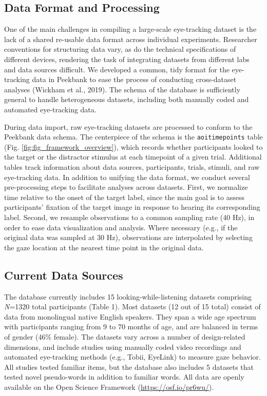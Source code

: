 \documentclass[10pt, letterpaper]{article}
\begin{document}
\hypertarget{data-format-and-processing}{%
\subsection{Data Format and
Processing}\label{data-format-and-processing}}

One of the main challenges in compiling a large-scale eye-tracking
dataset is the lack of a shared re-usable data format across individual
experiments. Researcher conventions for structuring data vary, as do the
technical specifications of different devices, rendering the task of
integrating datasets from different labs and data sources difficult. We
developed a common, tidy format for the eye-tracking data in Peekbank to
ease the process of conducting cross-dataset analyses (Wickham et al.,
2019). The schema of the database is sufficiently general to handle
heterogeneous datasets, including both manually coded and automated
eye-tracking data.

During data import, raw eye-tracking datasets are processed to conform
to the Peekbank data schema. The centerpiece of the schema is the
\texttt{aoi\textunderscore timepoints} table (Fig.
\ref{fig:fig_framework_overview}), which records whether participants
looked to the target or the distractor stimulus at each timepoint of a
given trial. Additional tables track information about data sources,
participants, trials, stimuli, and raw eye-tracking data. In addition to
unifying the data format, we conduct several pre-processing steps to
facilitate analyses across datasets. First, we normalize time relative
to the onset of the target label, since the main goal is to assess
participants' fixation of the target image in response to hearing its
corresponding label. Second, we resample observations to a common
sampling rate (40 Hz), in order to ease data visualization and analysis.
Where necessary (e.g., if the original data was sampled at 30 Hz),
observations are interpolated by selecting the gaze location at the
nearest time point in the original data.

\hypertarget{current-data-sources}{%
\subsection{Current Data Sources}\label{current-data-sources}}

The database currently includes 15 looking-while-listening datasets
comprising \emph{N}=1320 total participants (Table 1). Most datasets (12
out of 15 total) consist of data from monolingual native English
speakers. They span a wide age spectrum with participants ranging from 9
to 70 months of age, and are balanced in terms of gender (46\% female).
The datasets vary across a number of design-related dimensions, and
include studies using manually coded video recordings and automated
eye-tracking methods (e.g., Tobii, EyeLink) to measure gaze behavior.
All studies tested familiar items, but the database also includes 5
datasets that tested novel pseudo-words in addition to familiar words.
All data are openly available on the Open Science Framework
(\url{https://osf.io/pr6wu/}).
\end{document}
